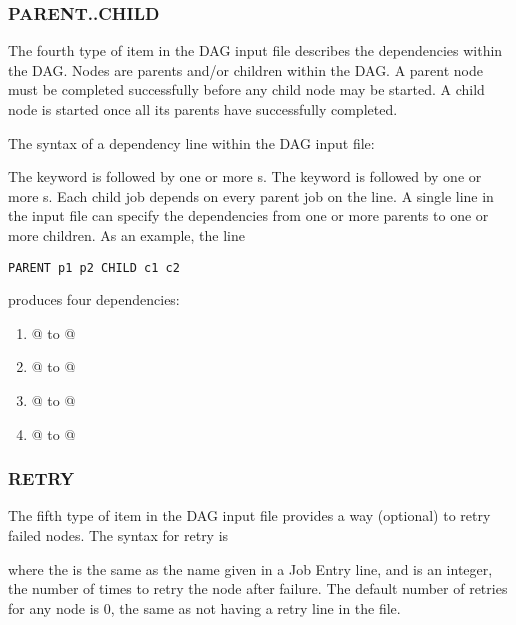 \subsubsection{\label{dagman:ParentChild}PARENT..CHILD}

The fourth type of item in the DAG input file describes the
dependencies within the DAG.
Nodes are parents and/or children within the DAG.
A parent node must be completed successfully before
any child node may be started.
A child node is started once
all its parents have successfully completed.

The syntax of a dependency line within the DAG input file:

   

The  keyword is followed by one or more
s.
The  keyword is followed by one or more
s.
Each child job depends on every parent job on the line.
A single line in the input file can specify the dependencies from one or more
parents to one or more children.
As an example, the line
\begin{verbatim}
PARENT p1 p2 CHILD c1 c2
\end{verbatim}
produces four dependencies:
\begin{enumerate}
\item{@ to @}
\item{@ to @}
\item{@ to @}
\item{@ to @}
\end{enumerate}

\subsubsection{RETRY}

The fifth type of item in the DAG input file provides a
way (optional) to retry failed nodes.
The syntax for retry is

   

where the  is the same as the name given in
a Job Entry line, and  is an integer,
the number of times to retry the node after failure.
The default number of retries for any node is 0,
the same as not having a retry line in the file. 


